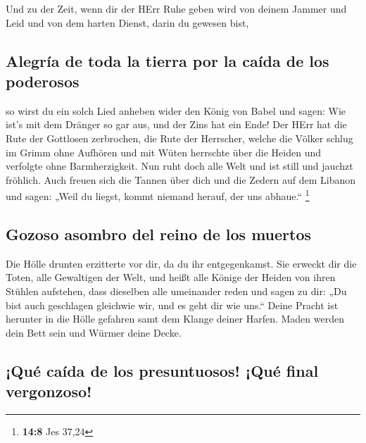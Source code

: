  Und zu der Zeit, wenn dir der HErr Ruhe geben wird von
deinem Jammer und Leid und von dem harten Dienst, darin du gewesen bist,

\hypertarget{alegruxeda-de-toda-la-tierra-por-la-cauxedda-de-los-poderosos}{%
\subsection{Alegría de toda la tierra por la caída de los
poderosos}\label{alegruxeda-de-toda-la-tierra-por-la-cauxedda-de-los-poderosos}}

 so wirst du ein solch Lied anheben wider den König von
Babel und sagen: Wie ist's mit dem Dränger so gar aus, und der Zins hat
ein Ende!  Der HErr hat die Rute der Gottlosen zerbrochen,
die Rute der Herrscher,  welche die Völker schlug im Grimm
ohne Aufhören und mit Wüten herrschte über die Heiden und verfolgte ohne
Barmherzigkeit.  Nun ruht doch alle Welt und ist still und
jauchzt fröhlich.  Auch freuen sich die Tannen über dich
und die Zedern auf dem Libanon und sagen: „Weil du liegst, kommt niemand
herauf, der uns abhaue.`` \footnote{\textbf{14:8} Jes 37,24}

\hypertarget{gozoso-asombro-del-reino-de-los-muertos}{%
\subsection{Gozoso asombro del reino de los
muertos}\label{gozoso-asombro-del-reino-de-los-muertos}}

 Die Hölle drunten erzitterte vor dir, da du ihr
entgegenkamst. Sie erweckt dir die Toten, alle Gewaltigen der Welt, und
heißt alle Könige der Heiden von ihren Stühlen aufstehen,
 dass dieselben alle umeinander reden und sagen zu dir:
„Du bist auch geschlagen gleichwie wir, und es geht dir wie uns.``
 Deine Pracht ist herunter in die Hölle gefahren samt dem
Klange deiner Harfen. Maden werden dein Bett sein und Würmer deine
Decke.

\hypertarget{quuxe9-cauxedda-de-los-presuntuosos-quuxe9-final-vergonzoso}{%
\subsection{¡Qué caída de los presuntuosos! ¡Qué final
vergonzoso!}\label{quuxe9-cauxedda-de-los-presuntuosos-quuxe9-final-vergonzoso}}

